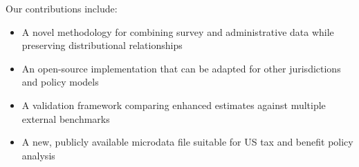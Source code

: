 Our contributions include:
\begin{itemize}
    \item A novel methodology for combining survey and administrative data while preserving distributional relationships
    \item An open-source implementation that can be adapted for other jurisdictions and policy models
    \item A validation framework comparing enhanced estimates against multiple external benchmarks
    \item A new, publicly available microdata file suitable for US tax and benefit policy analysis
\end{itemize}